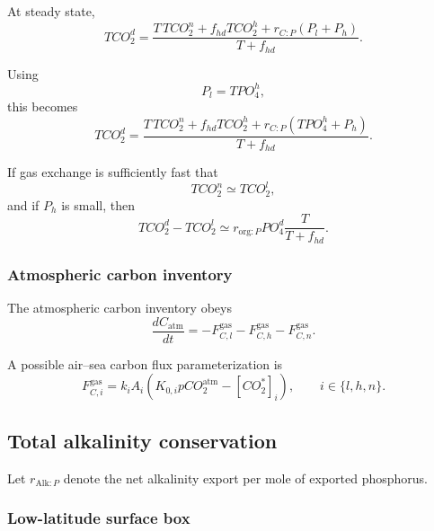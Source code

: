\documentclass[11pt]{article}
\begin{document}
At steady state,
\begin{equation}
TCO_2^d
=
\frac{
T\,TCO_2^n
+
f_{hd}TCO_2^h
+
r_{C:P}\left(P_l+P_h\right)
}{
T+f_{hd}
}.
\label{eq:four_tco2_d_steady}
\end{equation}

Using
\[
P_l=TPO_4^h,
\]
this becomes
\begin{equation}
TCO_2^d
=
\frac{
T\,TCO_2^n
+
f_{hd}TCO_2^h
+
r_{C:P}\left(TPO_4^h+P_h\right)
}{
T+f_{hd}
}.
\label{eq:four_tco2_d_steady_sub}
\end{equation}

If gas exchange is sufficiently fast that
\[
TCO_2^n\simeq TCO_2^l,
\]
and if \(P_h\) is small, then
\begin{equation}
TCO_2^d-TCO_2^l
\simeq
r_{\mathrm{org}:P}
PO_4^d
\frac{T}{T+f_{hd}}.
\label{eq:four_tco2_simplified}
\end{equation}

\subsubsection{Atmospheric carbon inventory}

The atmospheric carbon inventory obeys
\begin{equation}
\frac{dC_{\mathrm{atm}}}{dt}
=
-
F^{\mathrm{gas}}_{C,l}
-
F^{\mathrm{gas}}_{C,h}
-
F^{\mathrm{gas}}_{C,n}.
\label{eq:four_carbon_atmosphere}
\end{equation}

A possible air--sea carbon flux parameterization is
\begin{equation}
F^{\mathrm{gas}}_{C,i}
=
k_iA_i
\left(
K_{0,i}pCO_2^{\mathrm{atm}}
-
[CO_2^\ast]_i
\right),
\qquad
i\in\{l,h,n\}.
\label{eq:four_co2_gas_flux}
\end{equation}

\subsection{Total alkalinity conservation}

Let \(r_{\mathrm{Alk}:P}\) denote the net alkalinity export per
mole of exported phosphorus.

\subsubsection{Low-latitude surface box}
\end{document}
